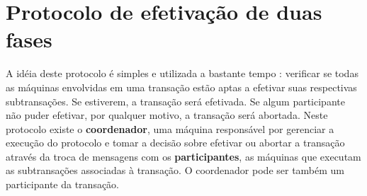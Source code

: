 \documentclass[11pt,twoside,a4paper]{book}
\begin{document}


\section{Protocolo de efetivação de duas fases}
\label{sec:2pc}
A idéia deste protocolo é simples e utilizada a bastante tempo \cite{2pc}: verificar se todas as máquinas envolvidas em uma transação estão aptas a efetivar suas respectivas subtransações. Se estiverem, a transação será efetivada. Se algum participante não puder efetivar, por qualquer motivo, a transação será abortada. Neste protocolo existe o \textbf{coordenador}, uma máquina responsável por gerenciar a execução do protocolo e tomar a decisão sobre efetivar ou abortar a transação através da troca de mensagens com os \textbf{participantes}, as máquinas que executam as subtransações associadas à transação. O coordenador pode ser também um participante da transação.
\end{document}
